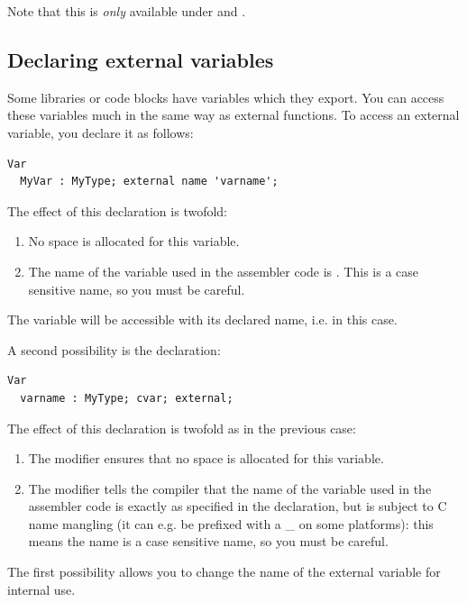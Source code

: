 \begin{enumerate}
\begin{remark}Note that this is {\em only} available under \windows and \ostwo.
\end{remark}
\end{enumerate}

\subsection{Declaring external variables}
\label{se:ExternalVars}

Some libraries or code blocks have variables which they export. You can access
these variables much in the same way as external functions. To access an
external variable, you declare it as follows:

\begin{verbatim}
Var
  MyVar : MyType; external name 'varname';
\end{verbatim}
The effect of this declaration is twofold:
\begin{enumerate}
\item No space is allocated for this variable.
\item The name of the variable used in the assembler code is .
This is a case sensitive name, so you must be careful.
\end{enumerate}
The variable will be
accessible with its declared name, i.e.  in this case.

A second possibility is the declaration:
\begin{verbatim}
Var
  varname : MyType; cvar; external;
\end{verbatim}
The effect of this declaration is twofold as in the previous case:
\begin{enumerate}
\item The  modifier ensures that no space is allocated for
this variable.
\item The  modifier tells the compiler that the name of the
variable used in the assembler code is exactly as specified in the
declaration, but is subject to C name mangling (it can e.g. be prefixed with
a \_ on some platforms): this means the name is a case sensitive name, so you must be careful.
\end{enumerate}
The first possibility allows you to change the name of the
external variable for internal use.

